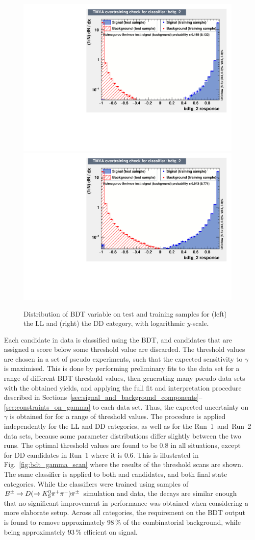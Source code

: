 \begin{figure}[tb]
    \centering
    \includegraphics[width=0.45\columnwidth]{figures/analysis/overtrain_check_LL.pdf}
    \includegraphics[width=0.45\columnwidth]{figures/analysis/overtrain_check_DD.pdf}
    \caption{Distribution of BDT variable on test and training samples for (left) the LL and (right) the DD category, with logarithmic $y$-scale.}
    \label{fig:overtrain}
\end{figure}

Each candidate in data is classified using the BDT, and candidates that are assigned a score below some threshold value are discarded. The threshold values are chosen in a set of pseudo experiments, such that the expected sensitivity to $\gamma$ is maximised. This is done by performing preliminary fits to the data set for a range of different BDT threshold values, then generating many pseudo data sets with the obtained yields, and applying the full fit and interpretation procedure described in Sections~\ref{sec:signal_and_background_components}--\ref{sec:constraints_on_gamma} to each data set. Thus, the expected uncertainty on $\gamma$ is obtained for for a range of threshold values. The procedure is applied independently for the LL and DD categories, as well as for the Run~1~and~Run~2 data sets, because some parameter distributions differ slightly between the two runs. The optimal threshold values are found to be 0.8 in all situations, except for DD candidates in Run~1 where it is 0.6. This is illustrated in Fig.~\ref{fig:bdt_gamma_scan} where the results of the threshold scans are shown. The same classifier is applied to both \BtoDpi and \BtoDK candidates, and both \D final state categories. While the classifiers were trained using samples of ${{B}^\pm}\rightarrow{\ensuremath{D}}(\rightarrow{\ensuremath{{K}^0_{\mathrm{S}}}}{\ensuremath{{\pi}^+}}{\ensuremath{{\pi}^-}}){{\pi}^\pm}$ simulation and data, the decays are similar enough that no significant improvement in performance was obtained when considering a more elaborate setup. Across all categories, the requirement on the BDT output is found to remove approximately 98\,\% of the combinatorial background, while being approximately 93\,\% efficient on signal.

